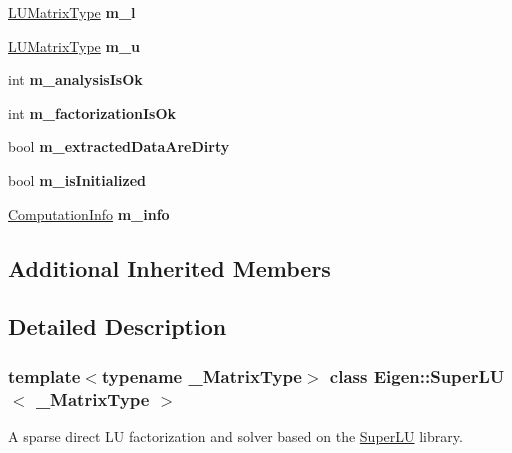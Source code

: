 \begin{DoxyCompactItemize}
\mbox{\hyperlink{class_eigen_1_1_sparse_matrix}{L\+U\+Matrix\+Type}} {\bfseries m\+\_\+l}
\item 
\mbox{\label{class_eigen_1_1_super_l_u_afb36c5aacb9f259263fef55a1b817cf8}} 
\mbox{\hyperlink{class_eigen_1_1_sparse_matrix}{L\+U\+Matrix\+Type}} {\bfseries m\+\_\+u}
\item 
\mbox{\label{class_eigen_1_1_super_l_u_ab771204f054be8e628428be9bdc321fd}} 
int {\bfseries m\+\_\+analysis\+Is\+Ok}
\item 
\mbox{\label{class_eigen_1_1_super_l_u_aea5a50c7ac8ae29dc9e8af39b5a85d4c}} 
int {\bfseries m\+\_\+factorization\+Is\+Ok}
\item 
\mbox{\label{class_eigen_1_1_super_l_u_a052669972e19b3225e3cb110c41876a1}} 
bool {\bfseries m\+\_\+extracted\+Data\+Are\+Dirty}
\item 
\mbox{\label{class_eigen_1_1_super_l_u_ac52101f69d048d5c4b036eadf1f13673}} 
bool {\bfseries m\+\_\+is\+Initialized}
\item 
\mbox{\label{class_eigen_1_1_super_l_u_a5d5ffbddf43cbca1994bbf6a469635f3}} 
\mbox{\hyperlink{group__enums_ga85fad7b87587764e5cf6b513a9e0ee5e}{Computation\+Info}} {\bfseries m\+\_\+info}
\end{DoxyCompactItemize}
\subsection*{Additional Inherited Members}


\subsection{Detailed Description}
\subsubsection*{template$<$typename \+\_\+\+Matrix\+Type$>$\newline
class Eigen\+::\+Super\+L\+U$<$ \+\_\+\+Matrix\+Type $>$}

A sparse direct LU factorization and solver based on the \mbox{\hyperlink{class_eigen_1_1_super_l_u}{Super\+LU}} library. 

